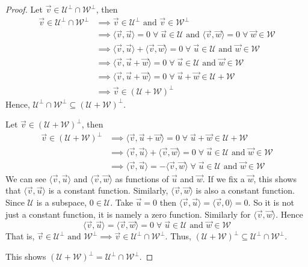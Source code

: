 \documentclass{article}
\begin{document}
\begin{proof}
Let $\vec{v} \in \mathcal{U}^\perp \cap \mathcal{W}^\perp$, then
\begin{align*}
\vec{v} \in \mathcal{U}^\perp \cap \mathcal{W}^\perp & \implies \vec{v} \in \mathcal{U}^\perp \text{ and } \vec{v} \in \mathcal{W}^\perp \\
& \implies \langle \vec{v} , \vec{u} \rangle =0 \;  \forall \; \vec{u} \in \mathcal{U} \text{ and } \langle \vec{v} , \vec{w} \rangle =0\;  \forall \; \vec{w} \in \mathcal{W} \\
& \implies \langle \vec{v}, \vec{u} \rangle + \langle \vec{v}, \vec{w} \rangle = 0 \; \forall \; \vec{u} \in \mathcal{U} \text{ and } \vec{w} \in \mathcal{W} \\
& \implies \langle \vec{v} , \vec{u} + \vec{w} \rangle =0  \; \forall \; \vec{u} \in \mathcal{U} \text{ and } \vec{w} \in \mathcal{W}\\
&  \implies \langle \vec{v} , \vec{u} + \vec{w} \rangle =0  \; \forall \; \vec{u} + \vec{w} \in \mathcal{U} + \mathcal{W} \\
& \implies \vec{v} \in (\mathcal{U} + \mathcal{W} )^\perp
\end{align*}
Hence, $\mathcal{U}^\perp \cap \mathcal{W} ^\perp \subseteq (\mathcal{U} + \mathcal{W} )^\perp$.
\medskip

Let $\vec{v} \in (\mathcal{U} + \mathcal{W} )^\perp$, then
\begin{align*}
\vec{v} \in (\mathcal{U} + \mathcal{W} )^\perp & \implies \langle \vec{v}, \vec{u} + \vec{w} \rangle = 0 \; \forall \;  \vec{u} + \vec{w} \in \mathcal{U} + \mathcal{W} \\
& \implies \langle \vec{v}, \vec{u} \rangle + \langle \vec{v}, \vec{w} \rangle = 0 \; \forall \; \vec{u} \in \mathcal{U} \text{ and } \vec{w} \in \mathcal{W} \\
& \implies \langle \vec{v}, \vec{u} \rangle = - \langle \vec{v}, \vec{w} \rangle  \; \forall \; \vec{u} \in \mathcal{U} \text{ and } \vec{w} \in \mathcal{W}
\end{align*}
We can see $\langle \vec{v}, \vec{u} \rangle$ and $\langle \vec{v}, \vec{w} \rangle$ as functions of $\vec{u}$ and $\vec{w}$. If we fix a $\vec{w}$, this shows that $\langle \vec{v}, \vec{u} \rangle$ is a constant function. Similarly,  $\langle \vec{v}, \vec{w} \rangle$ is also a constant function. Since $\mathcal{U}$ is a subspace, $0\in \mathcal{U}$. Take $\vec{u} = 0$ then  $\langle \vec{v}, \vec{u} \rangle =\langle \vec{v}, 0 \rangle = 0$. So it is not just a constant function, it is namely a zero function. Similarly for $\langle \vec{v}, \vec{w} \rangle$. Hence 
$$ \langle \vec{v}, \vec{u} \rangle = \langle \vec{v}, \vec{w} \rangle = 0 \; \forall \; \vec{u} \in \mathcal{U} \text{ and } \vec{w} \in \mathcal{W}$$ 
That is, $\vec{v} \in \mathcal{U}^\perp \text{ and } \mathcal{W}^\perp \implies \vec{v} \in \mathcal{U}^\perp \cap \mathcal{W}^\perp$. Thus, $(\mathcal{U}+ \mathcal{W})^\perp \subseteq \mathcal{U}^\perp \cap \mathcal{W}^\perp$.

This shows $(\mathcal{U}+\mathcal{W})^\perp = \mathcal{U}^\perp \cap \mathcal{W}^\perp$.
\end{proof} 
\end{document}
